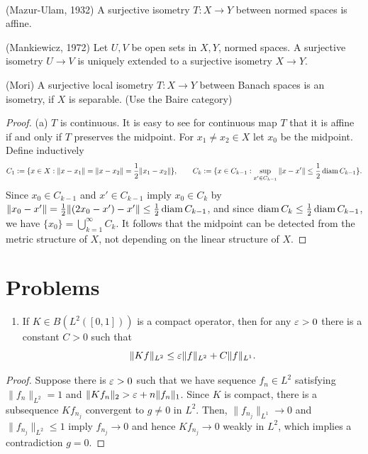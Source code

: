 \documentclass{../../large}
\begin{document}
\begin{prb}\,
\begin{parts}
\item (Mazur-Ulam, 1932) A surjective isometry $T:X\to Y$ between normed spaces is affine.
\item (Mankiewicz, 1972) Let $U,V$ be open sets in $X,Y$, normed spaces. A surjective isometry $U\to V$ is uniquely extended to a surjective isometry $X\to Y$.
\item (Mori) A surjective local isometry $T:X\to Y$ between Banach spaces is an isometry, if $X$ is separable. (Use the Baire category)
\end{parts}
\end{prb}
\begin{proof}
(a)
$T$ is continuous.
It is easy to see for continuous map $T$ that it is affine if and only if $T$ preserves the midpoint.
For $x_1\ne x_2\in X$ let $x_0$ be the midpoint.
Define inductively
\[C_1:=\{x\in X:\|x-x_1\|=\|x-x_2\|=\frac12\|x_1-x_2\|\},\qquad C_k:=\{x\in C_{k-1}:\sup_{x'\in C_{k-1}}\|x-x'\|\le\frac12\operatorname{diam} C_{k-1}\}.\]
Since $x_0\in C_{k-1}$ and $x'\in C_{k-1}$ imply $x_0\in C_k$ by $\|x_0-x'\|=\frac12\|(2x_0-x')-x'\|\le\frac12\operatorname{diam} C_{k-1}$, and since $\operatorname{diam} C_k\le\frac12\operatorname{diam} C_{k-1}$, we have $\{x_0\}=\bigcup_{k=1}^\infty C_k$.
It follows that the midpoint can be detected from the metric structure of $X$, not depending on the linear structure of $X$.
\end{proof}


\section*{Problems}
\begin{enumerate}
\item If $K\in B(L^2([0,1]))$ is a compact operator, then for any $\varepsilon>0$ there is a constant $C>0$ such that
\[\|Kf\|_{L^2}\le\varepsilon\|f\|_{L^2}+C\|f\|_{L^1}.\]
\end{enumerate}

\begin{proof}
Suppose there is $\varepsilon>0$ such that we have sequence $f_n\in L^2$ satisfying $\|f_n\|_{L^2}=1$ and $\|Kf_n\|_2>\varepsilon+n\|f_n\|_1$.
Since $K$ is compact, there is a subsequence $Kf_{n_j}$ convergent to $g\ne0$ in $L^2$.
Then, $\|f_{n_j}\|_{L^1}\to0$ and $\|f_{n_j}\|_{L^2}\le1$ imply $f_{n_j}\to0$ and hence $Kf_{n_j}\to0$ weakly in $L^2$, which implies a contradiction $g=0$.
\end{proof}
\end{document}
